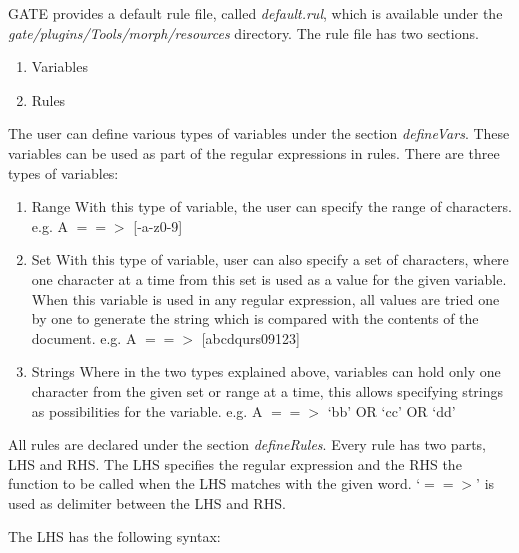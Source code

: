 
GATE provides a default rule file, called \textit{default.rul}, which
is available under the \textit{gate/plugins/Tools/morph/resources}
directory. The rule file has two sections.

\begin{enumerate}
\item{Variables}
\item{Rules}
\end{enumerate}


The user can define various types of variables under the section
\textit{defineVars}. These variables can be used as part of the regular
expressions in rules. There are three types of variables:

\begin{enumerate}

\item{Range} With this type of variable, the user can specify the range of
characters. e.g. A $==>$ [-a-z0-9]

\item{Set} With this type of variable, user can also specify a set of
characters, where one character at a time from this set is used as a value for
the given variable. When this variable is used in any regular expression, all
values are tried one by one to generate the string which is compared with
the contents
of the document. e.g. A $==>$ [abcdqurs09123]

\item{Strings} Where in the two types explained above, variables can hold only
one character from the given set or range at a time, this allows specifying
strings as possibilities for the variable. e.g. A $==>$ `bb' OR `cc' OR `dd'

\end{enumerate}



All rules are declared under the section \textit{defineRules}. Every rule has
two parts, LHS and RHS. The LHS specifies the regular expression and the RHS
the function to be called when the LHS matches with the given word. `$==>$' is
used as delimiter between the LHS and RHS.

The LHS has the following syntax:

